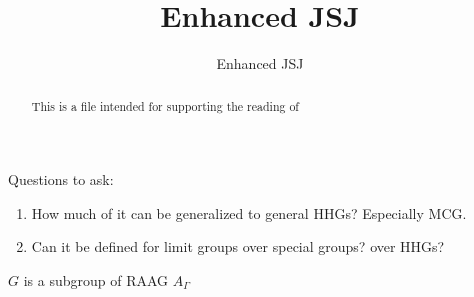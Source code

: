 \documentclass[11pt,a4paper]{article}
\title{Enhanced JSJ}
\author{Enhanced JSJ}
\date{}
\begin{document}
 
\maketitle
\begin{abstract}
    This is a file intended for supporting the reading of \cite{Fiv25}
\end{abstract}

Questions to ask:
\begin{enumerate}
    \item How much of it can be generalized to general HHGs? Especially MCG.
    \item Can it be defined for limit groups over special groups? over HHGs?
\end{enumerate}


$G$ is a subgroup of RAAG $A_\Gamma$
\end{document}
